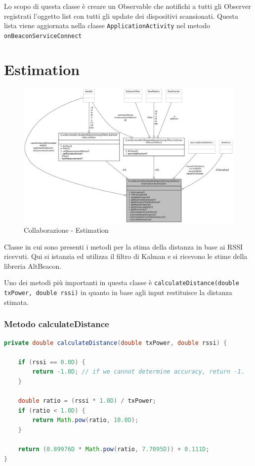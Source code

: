 Lo scopo di questa classe è creare un Observable che notifichi a tutti gli Observer registrati l'oggetto list con tutti gli update dei dispositivi scansionati. Questa lista viene aggiornata nella classe \texttt{ApplicationActivity} nel metodo \texttt{onBeaconServiceConnect}

\newpage
\section{Estimation}
\begin{figure}[ph]
	\centering
	\includegraphics[width=1.3\linewidth]{img/uml/class/classit_1_1unibo_1_1torsello_1_1bluetoothpositioning_1_1distanceEstimation_1_1Estimation__coll__graph.png}
	\caption{Collaborazione - Estimation}
\end{figure}

Classe in cui sono presenti i metodi per la stima della distanza in base ai RSSI ricevuti. Qui si istanzia ed utilizza il filtro di Kalman e si ricevono le stime della libreria AltBeacon.

Uno dei metodi più importanti in questa classe è \texttt{calculateDistance(double txPower, double rssi)} in quanto in base agli input restituisce la distanza stimata.

\subsubsection{Metodo calculateDistance}
\begin{lstlisting}[language=Java]
private double calculateDistance(double txPower, double rssi) {

	if (rssi == 0.0D) {
		return -1.0D; // if we cannot determine accuracy, return -1.
	}

	double ratio = (rssi * 1.0D) / txPower;
	if (ratio < 1.0D) {
		return Math.pow(ratio, 10.0D);
	}

	return (0.89976D * Math.pow(ratio, 7.7095D)) + 0.111D;
}
\end{lstlisting}



